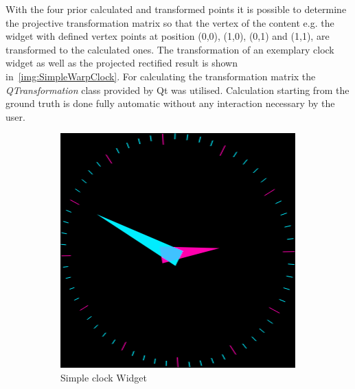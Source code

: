With the four prior calculated and transformed points it is possible to determine the projective transformation matrix so that the vertex of the content e.g. the widget with defined vertex points at position (0,0), (1,0), (0,1) and (1,1), are transformed to the calculated ones. 
The transformation of an exemplary clock widget as well as the projected rectified result is shown in~\autoref{img:SimpleWarpClock}. For calculating the transformation matrix the \textit{QTransformation} class provided by Qt was utilised. Calculation starting from the ground truth is done fully automatic without any interaction necessary by the user. 
\begin{figure}[htbp]
        \centering
        \begin{subfigure}[b]{0.27\textwidth}
                \includegraphics[width=\textwidth]{images/software/clock_3.png}
                \caption{Simple clock Widget}
                \label{img:SimpleWarpClock1}
        \end{subfigure}%
         \hfill 
         \begin{subfigure}[b]{0.27\textwidth}

\end{subfigure}
\end{figure}

